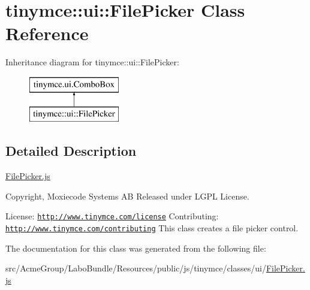 \hypertarget{classtinymce_1_1ui_1_1_file_picker}{\section{tinymce\+:\+:ui\+:\+:File\+Picker Class Reference}
\label{classtinymce_1_1ui_1_1_file_picker}
}
Inheritance diagram for tinymce\+:\+:ui\+:\+:File\+Picker\+:\begin{figure}[H]
\begin{center}
\leavevmode
\includegraphics[height=2.000000cm]{classtinymce_1_1ui_1_1_file_picker}
\end{center}
\end{figure}


\subsection{Detailed Description}
\hyperlink{_file_picker_8js}{File\+Picker.\+js}

Copyright, Moxiecode Systems A\+B Released under L\+G\+P\+L License.

License\+: \href{http://www.tinymce.com/license}{\tt http\+://www.\+tinymce.\+com/license} Contributing\+: \href{http://www.tinymce.com/contributing}{\tt http\+://www.\+tinymce.\+com/contributing} This class creates a file picker control. 

The documentation for this class was generated from the following file\+:\begin{DoxyCompactItemize}
\item 
src/\+Acme\+Group/\+Labo\+Bundle/\+Resources/public/js/tinymce/classes/ui/\hyperlink{_file_picker_8js}{File\+Picker.\+js}\end{DoxyCompactItemize}
